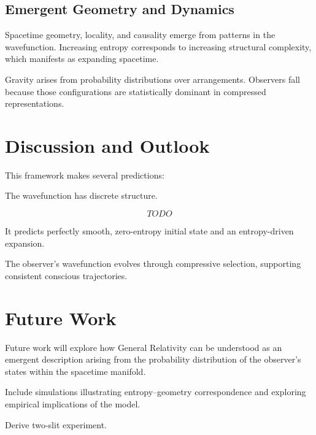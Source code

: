 \documentclass[11pt]{article}
\begin{document}
\subsection{Emergent Geometry and Dynamics}

Spacetime geometry, locality, and causality emerge from patterns in the wavefunction. Increasing entropy corresponds to increasing structural complexity, which manifests as expanding spacetime.

Gravity arises from probability distributions over arrangements. Observers fall because those configurations are statistically dominant in compressed representations.

\section{Discussion and Outlook}

This framework makes several predictions:

The wavefunction has discrete structure.

\[TODO\]

It predicts perfectly smooth, zero-entropy initial state and an entropy-driven expansion.

The observer’s wavefunction evolves through compressive selection, supporting consistent conscious trajectories.

\section {Future Work}

Future work will explore how General Relativity can be understood as an emergent description arising from the probability distribution of the observer’s states within the spacetime manifold.

Include simulations illustrating entropy–geometry correspondence and exploring empirical implications of the model.

Derive two-slit experiment.

\printbibliography
\end{document}
